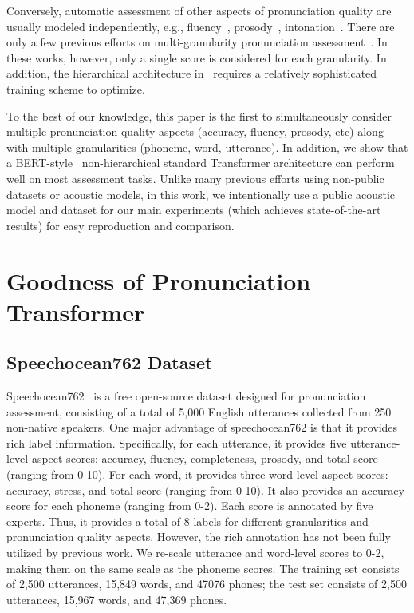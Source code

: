 \documentclass{article}
\newcommand{\squeezeup}{\vspace{-1.6mm}}
\begin{document}
Conversely, automatic assessment of other aspects of pronunciation quality are usually modeled independently, e.g., fluency~\cite{cucchiarini1998quantitative,cucchiarini2000quantitative}, prosody~\cite{bagshaw1994automatic,tepperman2005automatic}, intonation~\cite{arias2010automatic, LI2017innotation}. There are only a few previous efforts on multi-granularity pronunciation assessment~\cite{lin2020automatic,cincarek2009automatic}. In these works, however, only a single score is considered for each granularity. In addition, the hierarchical architecture in~\cite{lin2020automatic} requires a relatively sophisticated training scheme to optimize. 

To the best of our knowledge, this paper is the first to simultaneously consider multiple pronunciation quality aspects (accuracy, fluency, prosody, etc) along with multiple granularities (phoneme, word, utterance). In addition, we show that a BERT-style~\cite{devlin2018bert} non-hierarchical standard Transformer architecture can perform well on most assessment tasks. Unlike many previous efforts using non-public datasets or acoustic models, in this work, we intentionally use a public acoustic model and dataset for our main experiments (which achieves state-of-the-art results) for easy reproduction and comparison.

\squeezeup\squeezeup
\section{Goodness of Pronunciation Transformer}
\squeezeup
\label{sec:method}

\subsection{Speechocean762 Dataset}
Speechocean762~\cite{zhang2021speechocean762} is a free open-source dataset designed for pronunciation assessment, consisting of a total of 5,000 English utterances collected from 250 non-native speakers. One major advantage of speechocean762 is that it provides rich label information. Specifically, for each utterance, it provides five utterance-level aspect scores: accuracy, fluency, completeness, prosody, and total score (ranging from 0-10). For each word, it provides three word-level aspect scores: accuracy, stress, and total score (ranging from 0-10). It also provides an accuracy score for each phoneme (ranging from 0-2). Each score is annotated by five experts. Thus, it provides a total of 8 labels for different granularities and pronunciation quality aspects. However, the rich annotation has not been fully utilized by previous work. We re-scale utterance and word-level scores to 0-2, making them on the same scale as the phoneme scores. The training set consists of 2,500 utterances, 15,849 words, and 47076 phones; the test set consists of 2,500 utterances, 15,967 words, and 47,369 phones.
\end{document}
